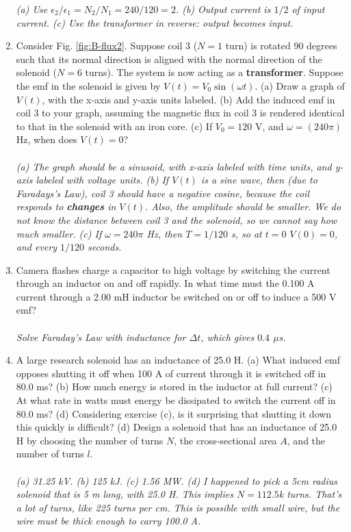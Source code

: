 \documentclass[12pt,twocolumn]{article}
\begin{document}
\begin{enumerate}
\textit{(a) Use $\epsilon_2/\epsilon_1 = N_2/N_1 = 240/120 = 2$. (b) Output current is $1/2$ of input current. (c) Use the transformer in reverse: output becomes input.}
\item Consider Fig. \ref{fig:B-flux2}.  Suppose coil 3 ($N=1$ turn) is rotated 90 degrees such that its normal direction is aligned with the normal direction of the solenoid ($N=6$ turns).  The system is now acting as a \textbf{transformer}.  Suppose the emf in the solenoid is given by $V(t) = V_0 \sin(\omega t)$. (a) Draw a graph of $V(t)$, with the x-axis and y-axis units labeled.  (b) Add the induced emf in coil 3 to your graph, assuming the magnetic flux in coil 3 is rendered identical to that in the solenoid with an iron core.  (c) If $V_0 = 120$ V, and $\omega = (240\pi)$ Hz, when does $V(t) = 0$? \\ \\
\textit{(a) The graph should be a sinusoid, with x-axis labeled with time units, and y-axis labeled with voltage units. (b) If $V(t)$ is a sine wave, then (due to Faradays's Law), coil 3 should have a negative cosine, because the coil responds to \textbf{changes} in $V(t)$.  Also, the amplitude should be smaller.  We do not know the distance between coil 3 and the solenoid, so we cannot say how much smaller. (c) If $\omega = 240\pi$ Hz, then $T = 1/120$ s, so at $t=0$ $V(0) = 0$, and every $1/120$ seconds.}
\item Camera flashes charge a capacitor to high voltage by switching the current through an inductor on and off rapidly. In what time must the 0.100 A current through a 2.00 mH inductor be switched on or off to induce a 500 V emf? \\ \\
\textit{Solve Faraday's Law with inductance for $\Delta t$, which gives $0.4$ $\mu$s.}
\item A large research solenoid has an inductance of 25.0 H. (a) What induced emf opposes shutting it off when 100 A of current through it is switched off in 80.0 ms? (b) How much energy is stored in the inductor at full current? (c) At what rate in watts must energy be dissipated to switch the current off in 80.0 ms? (d) Considering exercise (c), is it surprising that shutting it down this quickly is difficult? (d) Design a solenoid that has an inductance of 25.0 H by choosing the number of turns $N$, the cross-sectional area $A$, and the number of turns $l$. \\ \\
\textit{(a) 31.25 kV. (b) 125 kJ. (c) 1.56 MW. (d) I happened to pick a 5cm radius solenoid that is 5 m long, with 25.0 H.  This implies $N = 112.5$k turns.  That's a lot of turns, like 225 turns per cm.  This is possible with small wire, but the wire must be thick enough to carry 100.0 A.}

\end{enumerate}
\end{document}
